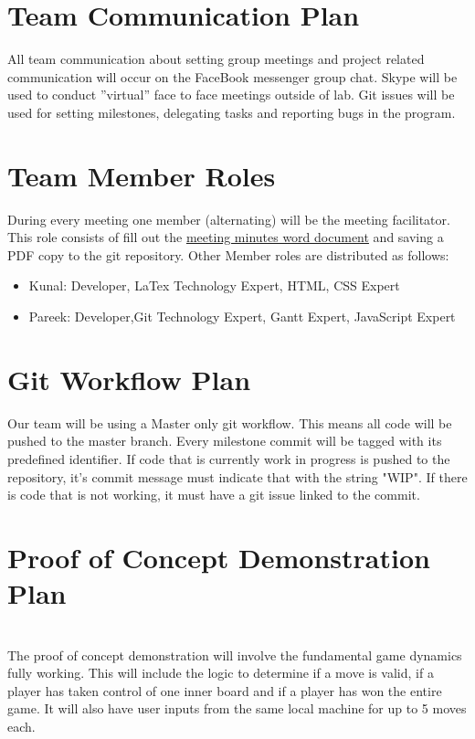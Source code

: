 \documentclass{article}
\begin{document}
\section{Team Communication Plan}
All team communication about setting group
meetings and project related communication will occur on the FaceBook messenger
group chat. Skype will be used to conduct ''virtual'' face to face meetings
outside of lab. Git issues will be used for setting milestones, delegating tasks
and reporting bugs in the program.

\section{Team Member Roles}
During every meeting one member (alternating) will
be the meeting facilitator. This role consists of fill out the \href{run:3XA3
Meeting Summary Template.docx}{meeting minutes word document}
and saving a PDF copy to the git repository. Other Member roles are distributed
as follows:
\begin{itemize}
  \item Kunal: Developer, LaTex Technology Expert, HTML, CSS Expert 
  \item Pareek: Developer,Git Technology Expert, Gantt Expert, JavaScript Expert 

\end{itemize}

\section{Git Workflow Plan}
Our team will be using a Master only git workflow.
This means all code will be pushed to the master branch. Every milestone commit
will be tagged with its predefined identifier. If code that is currently work in
progress is pushed to the repository, it's commit message must indicate that with the
string "WIP". If there is code that is not working, it must have a git issue
linked to the commit.

\section{Proof of Concept Demonstration Plan}
 \\
The proof of concept demonstration will involve the fundamental game dynamics
fully working. This will include the logic to determine if a move is valid, if a
player has taken control of one inner board and if a player has won the entire
game. It will also have user inputs from the same local machine for up to 5
moves each.
\end{document}
